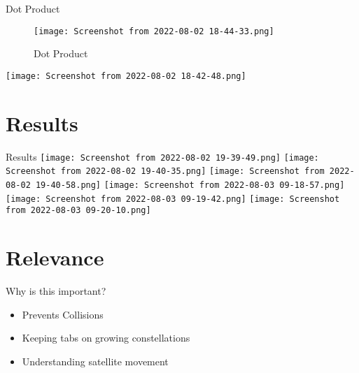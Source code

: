 \documentclass{beamer}
\begin{document}

\begin{frame}{Dot Product}
\begin{figure}
\texttt{[image: Screenshot from 2022-08-02 18-44-33.png]}
	\caption{Dot Product}
\end{figure}
\end{frame}


\begin{frame}
\texttt{[image: Screenshot from 2022-08-02 18-42-48.png]}
\end{frame}

\section{Results}
\begin{frame}{Results}
\texttt{[image: Screenshot from 2022-08-02 19-39-49.png]}
\texttt{[image: Screenshot from 2022-08-02 19-40-35.png]}
\texttt{[image: Screenshot from 2022-08-02 19-40-58.png]}
\texttt{[image: Screenshot from 2022-08-03 09-18-57.png]}
\texttt{[image: Screenshot from 2022-08-03 09-19-42.png]}
\texttt{[image: Screenshot from 2022-08-03 09-20-10.png]}
\end{frame}

\section{Relevance}
\begin{frame}{Why is this important?}
\begin{itemize}
\item Prevents Collisions
\item Keeping tabs on growing constellations
\item Understanding satellite movement
\end{itemize}
\end{frame}
\end{document}
